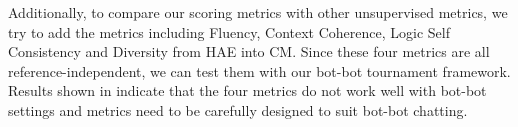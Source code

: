 

Additionally, to compare our scoring metrics with other 
unsupervised metrics, we try to add the metrics including Fluency, Context Coherence, Logic Self Consistency and Diversity
from HAE \citep{pang-etal-2020-towards} 
into CM.
Since these four metrics are all reference-independent, we can test them with our bot-bot tournament framework. 
Results shown in  indicate that
the four metrics do not work well with bot-bot settings and
 metrics need to be carefully designed to suit bot-bot chatting.

